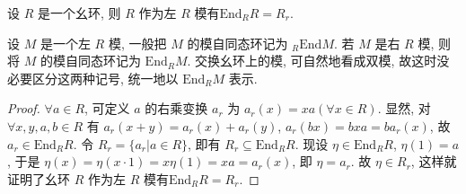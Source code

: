 \documentclass[../../main.tex]{subfiles}%
\begin{document}
\begin{example}
设 \( R \) 是一个幺环, 则 \( R \) 作为左 \( R \) 模有\( \text{End}_R R = R_r \).
\end{example}
\begin{remark}
设 \( M \) 是一个左 \( R \) 模, 一般把 \( M \) 的模自同态环记为 \( _R\text{End}M \). 若 \( M \) 是右 \( R \) 模, 则将 \( M \) 的模自同态环记为 \( \text{End}_R M \). 交换幺环上的模, 可自然地看成双模, 故这时没必要区分这两种记号, 统一地以 \( \text{End}_R M \) 表示.
\end{remark}
\begin{proof}

\( \forall a \in R \), 可定义 \( a \) 的右乘变换 \( a_r \) 为 \( a_r(x) = xa (\forall x \in R) \). 显然, 对 \( \forall x, y, a, b \in R \) 有 \( a_r(x + y) = a_r(x) + a_r(y) \), \( a_r(bx) = bxa = ba_r(x) \), 故 \( a_r \in \text{End}_R R \). 令 \( R_r = \{a_r|a \in R\} \), 即有 \( R_r \subseteq \text{End}_R R \). 现设 \( \eta \in \text{End}_R R \), \( \eta(1) = a \), 于是 \( \eta(x) = \eta(x \cdot 1) = x\eta(1) = xa = a_r(x) \), 即 \( \eta = a_r \). 故 \( \eta \in R_r \), 这样就证明了幺环 \( R \) 作为左 \( R \) 模有\( \text{End}_R R = R_r \).

\end{proof}
\end{document}
